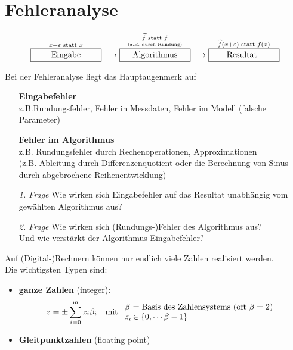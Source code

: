 %
%
%
%


\chapter{Fehleranalyse} \label{3}
\begin{align*}
  \overset{x+\varepsilon \text{ statt } x}{\framebox[3cm]{Eingabe}} \longrightarrow 
  \overset{\underset{\text{\tiny (z.B. durch Rundung)}}{\widetilde{f} \text{ statt } f}}{\framebox[3cm]{Algorithmus}} \longrightarrow
  \overset{\widetilde{f}(x+\varepsilon) \text{ statt } f(x)}{\framebox[3cm]{Resultat\phantom{g}}}
\end{align*}

Bei der Fehleranalyse liegt das Hauptaugenmerk auf
\begin{itemize}
\item[] \textbf{Eingabefehler}\\ z.B.Rundungsfehler, Fehler in Messdaten, Fehler im Modell (falsche Parameter)
\item[] \textbf{Fehler im Algorithmus} \\ z.B. Rundungsfehler durch Rechenoperationen, Approximationen \\
  (z.B. Ableitung durch Differenzenquotient oder die Berechnung von Sinus durch abgebrochene Reihenentwicklung)
  \\
\item[\textit{1. Frage}] Wie wirken sich Eingabefehler auf das Resultat unabhängig vom gewählten Algorithmus aus?
\item[\textit{2. Frage}]Wie wirken sich (Rundungs-)Fehler des Algorithmus aus?\\
  Und wie verstärkt der Algorithmus Eingabefehler?
\end{itemize}


 \label{3.1}  
Auf (Digital-)Rechnern können nur endlich viele Zahlen realisiert werden. \\
Die wichtigsten Typen sind: 
\begin{itemize}
\item \textbf{ganze Zahlen}  (integer):
  \begin{align*}
    z&=\pm \sum_{i=0}^{m}z_i\beta_i & \text{mit }
                                      \begin{array}{l@{\,}l}
                                        \beta &= \text{Basis des Zahlensystems (oft $\beta=2$)} \\
                                        z_i &\in \{0, \cdots \beta-1\}
                                      \end{array}
  \end{align*}
\item \textbf{Gleitpunktzahlen} (floating point) 
\end{itemize}

